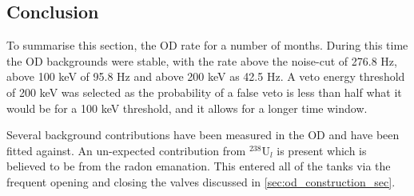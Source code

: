 \subsection{Conclusion}
\par
To summarise this section, the OD rate for a number of months.
During this time the OD backgrounds were stable, with the rate above the noise-cut of 276.8 Hz, above 100 keV of 95.8 Hz and above 200 keV as 42.5 Hz.
A veto energy threshold of 200 keV was selected as the probability of a false veto is less than half what it would be for a 100 keV threshold, and it allows for a longer time window.
\par
Several background contributions have been measured in the OD and have been fitted against.
An un-expected contribution from ${}^{238}$U$_{l}$ is present which is believed to be from the radon emanation.
This entered all of the tanks via the frequent opening and closing the valves discussed in \autoref{sec:od_construction_sec}.

